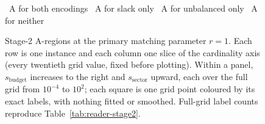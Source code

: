\begin{figure}[htbp]
\smallskip
{\small
{}~A for both encodings\quad
{}~A for slack only\quad
{}~A for unbalanced only\quad
{}~A for neither}
\caption{Stage-2 A-regions at the primary matching parameter $r=1$. Each row is one
instance and each column one slice of the cardinality axis (every twentieth grid
value, fixed before plotting). Within a panel, $s_{\text{budget}}$ increases to the
right and $s_{\text{sector}}$ upward, each over the full grid from $10^{-4}$ to
$10^{2}$; each square is one grid point coloured by its exact labels, with nothing
fitted or smoothed. Full-grid label counts reproduce Table~\ref{tab:reader-stage2}.\dag}
\label{fig:aregions}
\end{figure}
